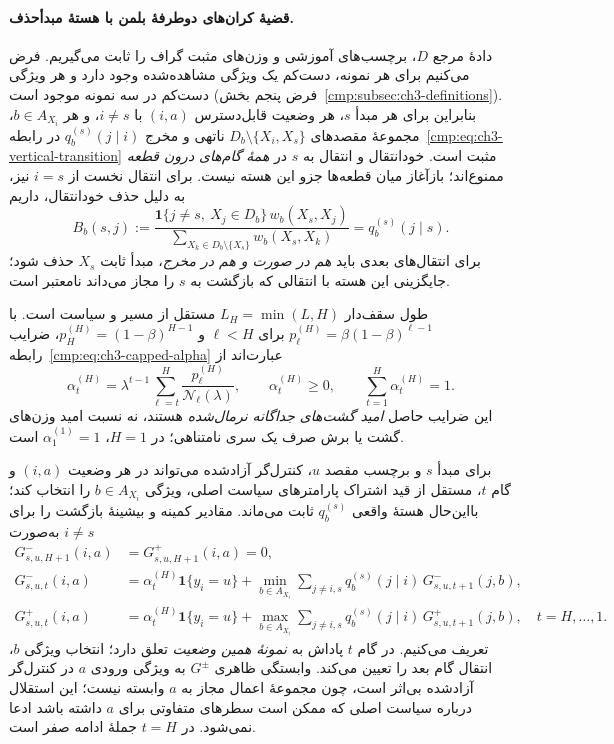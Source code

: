 \paragraph{قضیهٔ کران‌های دوطرفهٔ بلمن با هستهٔ مبدأحذف.}
دادهٔ مرجع $D$، برچسب‌های آموزشی و وزن‌های مثبت گراف را ثابت می‌گیریم.
فرض می‌کنیم برای هر نمونه، دست‌کم یک ویژگی مشاهده‌شده وجود دارد و هر ویژگی
دست‌کم در سه نمونه موجود است (فرض پنجم بخش~\ref{cmp:subsec:ch3-definitions}).
بنابراین برای هر مبدأ $s$، هر وضعیت قابل‌دسترس $(i,a)$ با $i\ne s$، و
هر $b\in A_{X_i}$، مجموعهٔ مقصدهای
$D_b\setminus\{X_i,X_s\}$ ناتهی و مخرج
$q_b^{(s)}(j\mid i)$ در رابطه~\eqref{cmp:eq:ch3-vertical-transition}
مثبت است. خودانتقال و انتقال به $s$ در \emph{همهٔ گام‌های درون قطعه}
ممنوع‌اند؛ بازآغاز میان قطعه‌ها جزو این هسته نیست.
برای انتقال نخست از $i=s$ نیز، به دلیل حذف خودانتقال، داریم
\[
B_b(s,j):=\frac{\mathbf1\{j\ne s,\ X_j\in D_b\}\,w_b(X_s,X_j)}
{\sum_{X_k\in D_b\setminus\{X_s\}}w_b(X_s,X_k)}
=q_b^{(s)}(j\mid s).
\]
برای انتقال‌های بعدی باید \emph{هم در صورت و هم در مخرج}، مبدأ ثابت
$X_s$ حذف شود؛ جایگزینی این هسته با انتقالی که بازگشت به $s$ را مجاز می‌داند
نامعتبر است.

طول سقف‌دار $L_H=\min(L,H)$ مستقل از مسیر و سیاست است.
با $p_\ell^{(H)}=\beta(1-\beta)^{\ell-1}$ برای $\ell<H$ و
$p_H^{(H)}=(1-\beta)^{H-1}$، ضرایب رابطه~\eqref{cmp:eq:ch3-capped-alpha} عبارت‌اند از
\[
\alpha_t^{(H)}
=\lambda^{t-1}\sum_{\ell=t}^{H}\frac{p_\ell^{(H)}}{\mathcal N_\ell(\lambda)},
\qquad
\alpha_t^{(H)}\ge0,\qquad \sum_{t=1}^{H}\alpha_t^{(H)}=1.
\]
این ضرایب حاصل \emph{امید گشت‌های جداگانه نرمال‌شده} هستند، نه
نسبت امید وزن‌های گشت یا برش صرف یک سری نامتناهی؛ در $H=1$،
$\alpha_1^{(1)}=1$ است.

برای مبدأ $s$ و برچسب مقصد $u$، کنترل‌گر آزادشده می‌تواند در هر
وضعیت $(i,a)$ و گام $t$، مستقل از قید اشتراک پارامترهای سیاست اصلی،
ویژگی $b\in A_{X_i}$ را انتخاب کند؛ بااین‌حال هستهٔ واقعی
$q_b^{(s)}$ ثابت می‌ماند. مقادیر کمینه و بیشینهٔ بازگشت را
برای $i\ne s$ به‌صورت
\begin{equation}\label{eq:app-ch3-feasibility-Bellman}
\boxed{\begin{aligned}
G_{s,u,H+1}^{-}(i,a)&=G_{s,u,H+1}^{+}(i,a)=0,\\
G_{s,u,t}^{-}(i,a)
&=\alpha_t^{(H)}\mathbf1\{y_i=u\}
+\min_{b\in A_{X_i}}\sum_{j\ne i,s}
q_b^{(s)}(j\mid i)\,G_{s,u,t+1}^{-}(j,b),\\
G_{s,u,t}^{+}(i,a)
&=\alpha_t^{(H)}\mathbf1\{y_i=u\}
+\max_{b\in A_{X_i}}\sum_{j\ne i,s}
q_b^{(s)}(j\mid i)\,G_{s,u,t+1}^{+}(j,b),
\quad t=H,\ldots,1.
\end{aligned}}
\end{equation}
تعریف می‌کنیم. در گام $t$ پاداش به \emph{نمونهٔ همین وضعیت} تعلق دارد؛
انتخاب ویژگی $b$، انتقال گام بعد را تعیین می‌کند. وابستگی ظاهری
$G^\pm$ به ویژگی ورودی $a$ در کنترل‌گر آزادشده بی‌اثر است، چون
مجموعهٔ اعمال مجاز به $a$ وابسته نیست؛ این استقلال درباره سیاست
اصلی که ممکن است سطرهای متفاوتی برای $a$ داشته باشد ادعا نمی‌شود.
در $t=H$ جملهٔ ادامه صفر است.

